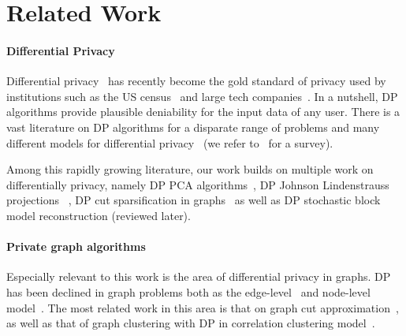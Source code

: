\section{Related Work}\label{app:related}

\paragraph{Differential Privacy} 
Differential privacy~\citep{dwork2006calibrating} has recently become the gold standard of privacy used by institutions such as the US census~\citep{dwork2019differential} and large tech companies~\citep{erlingsson2014rappor}. In a nutshell, DP algorithms provide plausible deniability for the input data of any user.   
There is a vast literature on DP algorithms for a disparate range of problems and many different models for differential privacy~\citep{dwork2006calibrating,mcsherry2007mechanism,chaudhuri2011differentially,roy2020crypte,machanavajjhala2017differential,dwork2019differential} (we refer to~\citet{dwork2014algorithmic} for a survey). 

Among this rapidly growing literature, our work builds on multiple work on differentially privacy, namely DP PCA algorithms~\citep{dwork2014analyze}, DP Johnson Lindenstrauss projections~ \citep{blocki2012johnson}, DP cut sparsification in graphs~\citep{eliavs2020differentially} as well as DP stochastic block model reconstruction (reviewed later). 

\paragraph{Private graph algorithms}
Especially relevant to this work is the area of differential privacy in graphs. DP has been  declined in graph problems both as  the edge-level~\citep{epasto2022differentially,eliavs2020differentially} and node-level  model~\citep{kasiviswanathan2013analyzing}. The most related work in this area is that on graph cut approximation~\citep{eliavs2020differentially,arora2019differentially}, as well as that of graph clustering with DP in correlation clustering model~\citep{bun2021differentially, cohen2022near}. 


